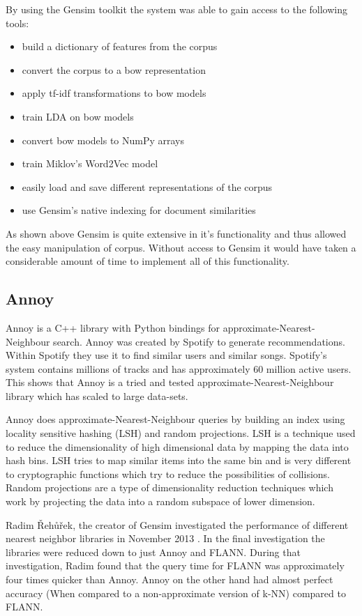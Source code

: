 By using the Gensim toolkit the system was able to gain access to the following tools:
\begin{itemize}
    \item build a dictionary of features from the corpus
    \item convert the corpus to a bow representation
    \item apply tf-idf transformations to bow models
    \item train LDA on bow models
    \item convert bow models to NumPy arrays
    \item train Miklov's Word2Vec model
    \item easily load and save different representations of the corpus
    \item use Gensim's native indexing for document similarities
\end{itemize}

As shown above Gensim is quite extensive in it's functionality and thus allowed the easy manipulation of corpus.
Without access to Gensim it would have taken a considerable amount of time to implement all of this functionality.

\subsection{Annoy}
Annoy is a C++ library with Python bindings for approximate-Nearest-Neighbour search.
Annoy was created by Spotify to generate recommendations.
Within Spotify they use it to find similar users and similar songs.
Spotify's system contains millions of tracks and has approximately 60 million active users.
This shows that Annoy is a tried and tested approximate-Nearest-Neighbour library which has scaled to large data-sets.

Annoy does approximate-Nearest-Neighbour queries by building an index using locality sensitive hashing (LSH) and random projections.
LSH is a technique used to reduce the dimensionality of high dimensional data by mapping the data into hash bins.
LSH tries to map similar items into the same bin and is very different to cryptographic functions which try to reduce the possibilities of collisions\cite{slaney2008locality}.
Random projections are a type of dimensionality reduction techniques which work by projecting the data into a random subspace of lower dimension\cite{Dasgupta2000}.

Radim {\v R}eh{\r u}{\v r}ek, the creator of Gensim investigated the performance of different nearest neighbor libraries in November 2013 \cite{radimKnnInvestigation}.
In the final investigation the libraries were reduced down to just Annoy and FLANN.
During that investigation, Radim found that the query time for FLANN was approximately four times quicker than Annoy.
Annoy on the other hand had almost perfect accuracy (When compared to a non-approximate version of k-NN) compared to FLANN.

